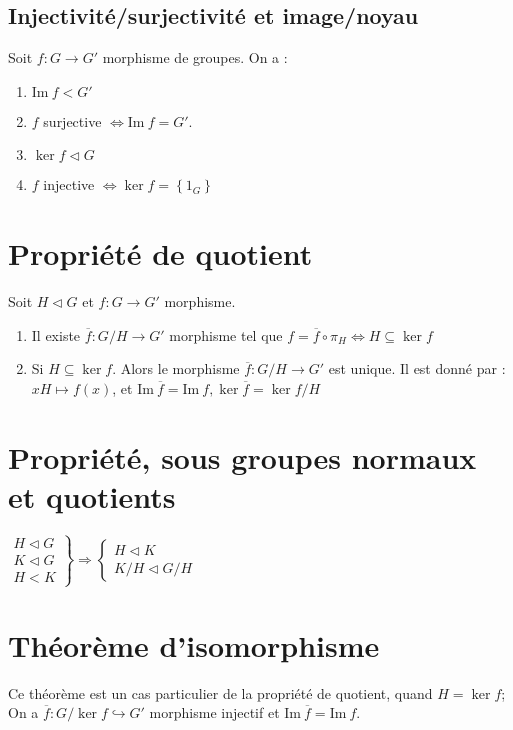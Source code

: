 \documentclass[a4paper,10pt]{report}
\newcommand{\set}[1]{\left\lbrace #1 \right\rbrace } %
\newcommand{\im}{\mathrm{Im}\:} %
\newcommand{\so}{\Rightarrow}
\newcommand{\inj}{\hookrightarrow}
\begin{document}
   \subsection{Injectivité/surjectivité et image/noyau}
    Soit $f: G \to G'$ morphisme de groupes. On a :
    \begin{enumerate}
      \item $\im f < G'$	
      \item $f$ surjective $\iff \im f=G'$.
      \item $\ker f \triangleleft G$
      \item $f$ injective $\iff \ker f=\set{1_G}$
    \end{enumerate}

  \section{Propriété de quotient}
   Soit $H \triangleleft G$ et $f:G \to G'$ morphisme.
   \begin{enumerate}
     \item Il existe $\overline{f}:G/H \to G'$ morphisme tel que
       $f=\overline{f} \circ \pi_H \iff H \subseteq \ker f$
     \item Si $H \subseteq \ker f$. Alors le morphisme $\overline{f}:G/H \to G'$
       est unique. Il est donné par : $xH \mapsto f(x)$, et $\im
       \overline{f}=\im f, \ker \overline{f} = \ker f/H$
   \end{enumerate}
  \section{Propriété, sous groupes normaux et quotients}
   $\left.
   \begin{array}{r}
     H \triangleleft G\\
     K \triangleleft G\\
     H < K
   \end{array}
   \right\}
   \so
   \begin{cases}
     H \triangleleft K\\
     K/H \triangleleft G/H
   \end{cases}$
   

  \section{Théorème d'isomorphisme}
   Ce théorème est un cas particulier de la propriété de quotient,
   quand $H=\ker f$;\\
   On a $\overline{f}:G/\ker f \inj G'$ morphisme injectif et $\im \overline{f}
   = \im f$.
\end{document}
